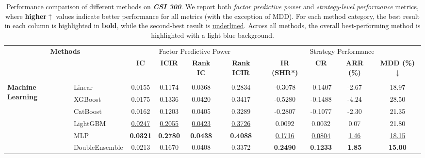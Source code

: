 \begin{table}[h]
\centering
\caption{
Performance comparison of different methods on \textit{\textbf{CSI 300}}.
We report both \textit{factor predictive power} and \textit{strategy-level performance} metrics, where \textbf{higher$\uparrow$} values  indicate better performance for all metrics (with the exception of MDD).
For each method category, the best result in each column is highlighted in \textbf{bold},
while the second-best result is \underline{underlined}.
Across all methods, the overall best-performing method is highlighted with a light \colorbox[RGB]{236,244,252}{blue background}.
}
\label{tab:csi300_results}
\setlength\tabcolsep{3.2pt}
\fontsize{8.1pt}{10.5pt}\selectfont
\begin{tabular}{llcccccccc}
\toprule[1.5pt]

\multicolumn{2}{c}{\multirow{2}{*}{\textbf{Methods}}} 
& \multicolumn{4}{c}{Factor Predictive Power}
& \multicolumn{4}{c}{Strategy Performance} \\
\cmidrule(lr){3-6} \cmidrule(lr){7-10}

\multicolumn{2}{c}{} 
& \textbf{IC} & \textbf{ICIR} & \textbf{Rank IC} & \textbf{Rank ICIR} 
& \textbf{IR (SHR*)} & \textbf{CR} & \textbf{ARR (\%)} & \textbf{MDD (\%)$\downarrow$} \\
\midrule[0.8pt]
\rowcolor[RGB]{230, 230, 230}\multicolumn{10}{c}{\textit{\textbf{Classical Factor Mining}}} \\
\multirow{6}{*}{\textbf{Machine Learning}}
& Linear 
& 0.0155 
& 0.1174 
& 0.0368 
& 0.2834 
& -0.3078 
& -0.1407 
& -2.67 
& 18.97 \\


& XGBoost 
& 0.0175 
& 0.1336 
& 0.0420 
& 0.3417 
& -0.5280 
& -0.1488 
& -4.24 
& 28.50 \\

& CatBoost 
& 0.0162 
& 0.1203 
& 0.0405 
& 0.3289 
& -0.2807 
& -0.1077 
& -2.30 
& 21.35 \\

& LightGBM 
& \underline{0.0247} 
& \underline{0.2055} 
& \underline{0.0423} 
& \underline{0.3726} 
& 0.0092 
& 0.0032 
& 0.07 
& 21.80 \\


& MLP 
& \textbf{0.0321} 
& \textbf{0.2780} 
& \textbf{0.0438} 
& \textbf{0.4088} 
& \underline{0.1716} 
& \underline{0.0804} 
& \underline{1.46} 
& \underline{18.15} \\


& DoubleEnsemble 
& 0.0213 
& 0.1670 
& 0.0408 
& 0.3372 
& \textbf{0.2490} 
& \textbf{0.1233} 
& \textbf{1.85} 
& \textbf{15.00} \\


\end{tabular}
\end{table}
